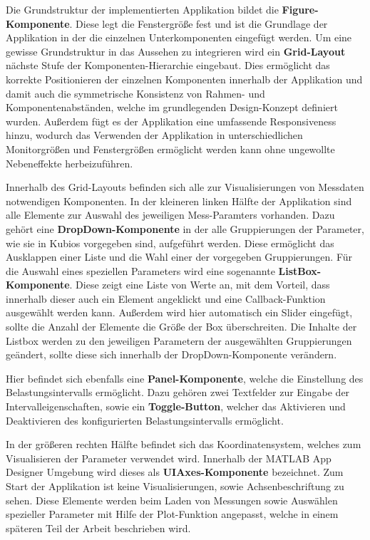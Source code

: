 \begin{minipage}{\linewidth}

\end{minipage}

Die Grundstruktur der implementierten Applikation bildet die \textbf{Figure-Komponente}. Diese legt die Fenstergröße fest und ist die Grundlage der Applikation in der die einzelnen Unterkomponenten eingefügt werden. Um eine gewisse Grundstruktur in das Aussehen zu integrieren wird ein \textbf{Grid-Layout} nächste Stufe der Komponenten-Hierarchie eingebaut. Dies ermöglicht das korrekte Positionieren der einzelnen Komponenten innerhalb der Applikation und damit auch die symmetrische Konsistenz von Rahmen- und Komponentenabständen, welche im grundlegenden Design-Konzept definiert wurden. Außerdem fügt es der Applikation eine umfassende Responsiveness hinzu, wodurch das Verwenden der Applikation in unterschiedlichen Monitorgrößen und Fenstergrößen ermöglicht werden kann ohne ungewollte Nebeneffekte herbeizuführen.

Innerhalb des Grid-Layouts befinden sich alle zur Visualisierungen von Messdaten notwendigen Komponenten. In der kleineren linken Hälfte der Applikation sind alle Elemente zur Auswahl des jeweiligen Mess-Paramters vorhanden. Dazu gehört eine \textbf{DropDown-Komponente} in der alle Gruppierungen der Parameter, wie sie in Kubios vorgegeben sind, aufgeführt werden. Diese ermöglicht das Ausklappen einer Liste und die Wahl einer der vorgegeben Gruppierungen. Für die Auswahl eines speziellen Parameters wird eine sogenannte \textbf{ListBox-Komponente}. Diese zeigt eine Liste von Werte an, mit dem Vorteil, dass innerhalb dieser auch ein Element angeklickt und eine Callback-Funktion ausgewählt werden kann. Außerdem wird hier automatisch ein Slider eingefügt, sollte die Anzahl der Elemente die Größe der Box überschreiten. Die Inhalte der Listbox werden zu den jeweiligen Parametern der ausgewählten Gruppierungen geändert, sollte diese sich innerhalb der DropDown-Komponente verändern.

Hier befindet sich ebenfalls eine \textbf{Panel-Komponente}, welche die Einstellung des Belastungsintervalls ermöglicht. Dazu gehören zwei Textfelder zur Eingabe der Intervalleigenschaften, sowie ein \textbf{Toggle-Button}, welcher das Aktivieren und Deaktivieren des konfigurierten Belastungsintervalls ermöglicht.

In der größeren rechten Hälfte befindet sich das Koordinatensystem, welches zum Visualisieren der Parameter verwendet wird. Innerhalb der MATLAB App Designer Umgebung wird dieses als \textbf{UIAxes-Komponente} bezeichnet. Zum Start der Applikation ist keine Visualisierungen, sowie Achsenbeschriftung zu sehen. Diese Elemente werden beim Laden von Messungen sowie Auswählen spezieller Parameter mit Hilfe der Plot-Funktion angepasst, welche in einem späteren Teil der Arbeit beschrieben wird.

